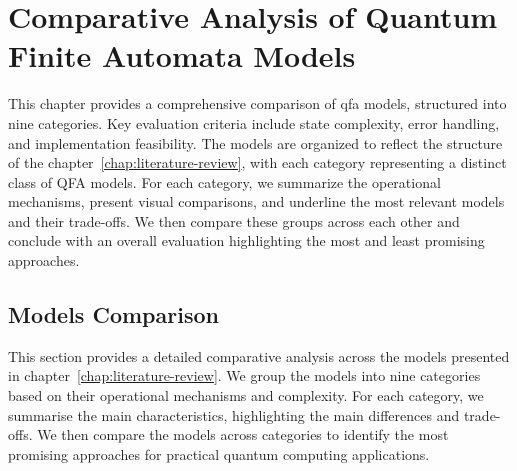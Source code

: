 
\chapter{Comparative Analysis of Quantum Finite Automata Models}
\label{chap:comparative-analysis}
This chapter provides a comprehensive comparison of \gls{qfa} models, structured into nine categories. Key evaluation criteria include state complexity, error handling, and implementation feasibility. 
The models are organized to reflect the structure of the chapter~\ref{chap:literature-review}, with each category representing a distinct class of QFA models.
For each category, we summarize the operational mechanisms, present visual comparisons, and underline the most relevant models and their trade-offs. We then compare these groups across each other and conclude with an overall evaluation highlighting the most and least promising approaches.

\section{Models Comparison}
This section provides a detailed comparative analysis across the models presented in chapter~\ref{chap:literature-review}. We group the models into nine categories based on their operational mechanisms and complexity. For each category, we summarise the main characteristics, highlighting the main differences and trade-offs. We then compare the models across categories to identify the most promising approaches for practical quantum computing applications.

\subsection*{}

